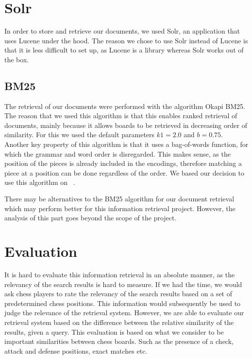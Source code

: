 \documentclass[11pt]{article}
\begin{document}
    \section{Solr}

    In order to store and retrieve our documents, we used Solr, an application that uses Lucene under the hood. The reason we chose to use Solr instead of Lucene is that it is less difficult to set up, as Lucene is a library whereas Solr works out of the box.

    \subsection{BM25}

    The retrieval of our documents were performed with the algorithm Okapi BM25. The reason that we used this algorithm is that this enables ranked retrieval of documents, mainly because it allows boards to be retrieved in decreasing order of similarity. For this we used the default parameters $k1 = 2.0$ and $b = 0.75$. Another key property of this algorithm is that it uses a bag-of-words function, for which the grammar and word order is disregarded. This makes sense, as the position of the pieces is already included in the encodings, therefore matching a piece at a position can be done regardless of the order. We based our decision to use this algorithm on ~\cite{SimilarChessPositions}.


    There may be alternatives to the BM25 algorithm for our document retrieval which may perform better for this information retrieval project. However, the analysis of this part goes beyond the scope of the project.




    \section{Evaluation}

    It is hard to evaluate this information retrieval in an absolute manner, as the relevancy of the search results is hard to measure. If we had the time, we would ask chess players to rate the relevancy of the search results based on a set of predetermined chess positions. This information would subsequently be used to judge the relevance of the retrieval system. However, we are able to evaluate our retrieval system based on the difference between the relative similarity of the results, given a query. This evaluation is based on what we consider to be important similarities between chess boards. Such as the presence of a check, attack and defense positions, exact matches etc.
\end{document}
